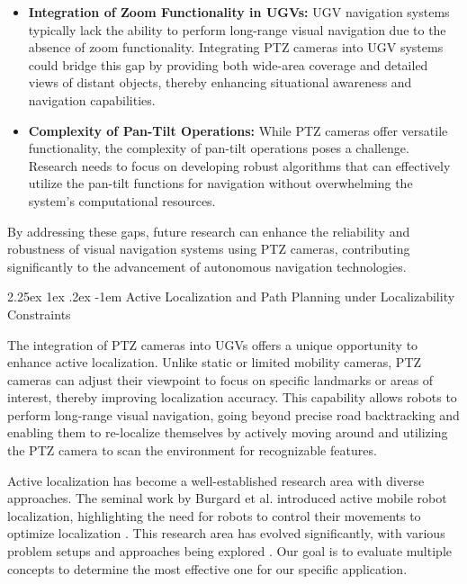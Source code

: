 \documentclass[runningheads]{llncs}
\makeatletter
\renewcommand\paragraph{\@startsection{paragraph}{4}{\z@}%
                                    {2.25ex \@plus1ex \@minus.2ex}%
                                    {-1em}%
                                    {\normalfont\normalsize\bfseries}}
\makeatother
\begin{document}
\begin{itemize}

    \item \textbf{Integration of Zoom Functionality in UGVs:}
    UGV navigation systems typically lack the ability to perform long-range visual navigation due to the absence of zoom functionality. Integrating PTZ cameras into UGV systems could bridge this gap by providing both wide-area coverage and detailed views of distant objects, thereby enhancing situational awareness and navigation capabilities.

    \item \textbf{Complexity of Pan-Tilt Operations:}
    While PTZ cameras offer versatile functionality, the complexity of pan-tilt operations poses a challenge. Research needs to focus on developing robust algorithms that can effectively utilize the pan-tilt functions for navigation without overwhelming the system’s computational resources.

\end{itemize}

By addressing these gaps, future research can enhance the reliability and robustness of visual navigation systems using PTZ cameras, contributing significantly to the advancement of autonomous
navigation technologies.

\paragraph{Active Localization and Path Planning under Localizability Constraints}

The integration of PTZ cameras into UGVs offers a unique opportunity to enhance active localization. Unlike static or limited mobility cameras, PTZ cameras can adjust their viewpoint to focus on specific landmarks or areas of interest, thereby improving localization accuracy. This capability allows robots to perform long-range visual navigation, going beyond precise road backtracking and enabling them to re-localize themselves by actively moving around and utilizing the PTZ camera to scan the environment for recognizable features.

Active localization has become a well-established research area with diverse approaches. The seminal work by Burgard et al. introduced active mobile robot localization, highlighting the need for robots to control their movements to optimize localization \cite{burgard1997active}. This research area has evolved significantly, with various problem setups and approaches being explored \cite{BurgardActiveMarkovLocaliation, AutonomousRoboticExplorationGraph}. Our goal is to evaluate multiple concepts to determine the most effective one for our specific application.
\end{document}
